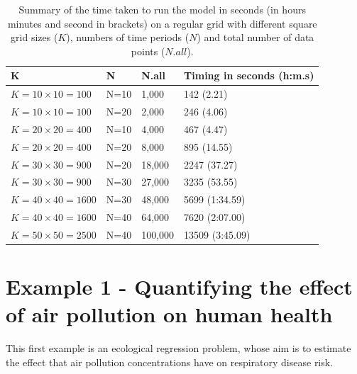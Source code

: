 \documentclass[article, nojss]{jss}
\begin{document}
\begin{table}
\begin{center}
\begin{tabular}{llll}
\hline \textbf{K}&\textbf{N}&\textbf{N.all} & \textbf{Timing in seconds (h:m.s)}\\\hline
$K=10\times 10=100$ &N=10& 1,000&142 (2.21)\\
$K=10\times 10=100$ &N=20& 2,000&246 (4.06)\\
$K=20 \times 20=400$ &N=10& 4,000&467 (4.47)\\
$K=20 \times 20=400$ & N=20& 8,000&895 (14.55)\\
$K=30 \times 30=900$ & N=20& 18,000&2247 (37.27)\\
$K=30 \times 30=900$ & N=30& 27,000&3235 (53.55) \\
$K=40 \times 40=1600$ & N=30& 48,000&5699 (1:34.59)\\
$K=40 \times 40=1600$ & N=40& 64,000&7620 (2:07.00)\\
$K=50 \times 50=2500$ & N=40& 100,000&13509 (3:45.09)\\\hline
\end{tabular}
\caption{Summary of the time taken to run the  model in seconds (in hours minutes and second in brackets) on a regular grid with different square grid sizes ($K$), numbers of time periods ($N$) and total number of data points ($N.all$).\label{tablesim2}}
\end{center}
\end{table}



\section{Example 1 - Quantifying the effect of air pollution on human health}
This first example is an ecological regression problem, whose aim is to estimate the effect that air pollution concentrations have on respiratory disease risk. 
\end{document}
